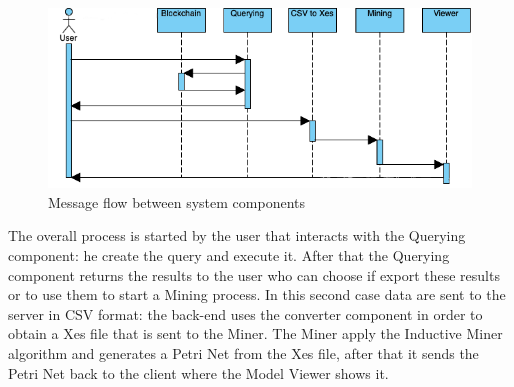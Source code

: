 \begin{figure}[!ht]
    \centering
\includegraphics[width=\textwidth]{images/sequence_diagram.png}
    \caption{Message flow between system components}
    \label{images:sequence_flow}
\end{figure}

The overall process is started by the user that interacts with the Querying component: he create the query and execute it. After 
that the Querying component returns the results to the user who can choose if export these results or to use them to start a 
Mining process. In this second case data are sent to the server in CSV format: the back-end uses the converter component in order 
to obtain a Xes file that is sent to the Miner. The Miner apply the Inductive Miner algorithm and generates a Petri Net from the 
Xes file, after that it sends the Petri Net back to the client where the Model Viewer shows it.